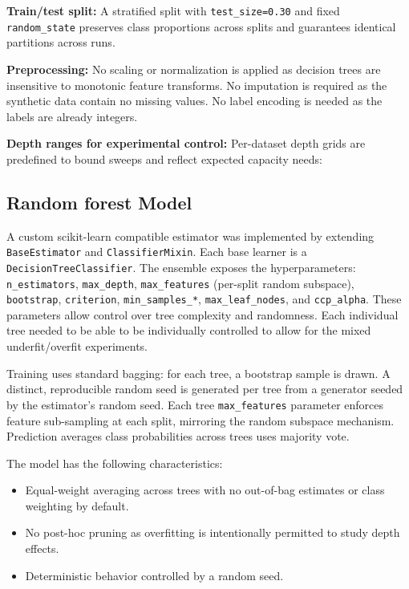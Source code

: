 \documentclass[conference]{IEEEtran}
\begin{document}
\textbf{Train/test split:} A stratified split with \texttt{test\_size=0.30} and fixed \texttt{random\_state} preserves 
class proportions across splits and guarantees identical partitions across runs.


\textbf{Preprocessing:} No scaling or normalization is applied as decision trees are insensitive to monotonic feature transforms. No imputation is
 required as the synthetic data contain no missing values. No label encoding is needed as the labels are already integers.

\textbf{Depth ranges for experimental control:} Per-dataset depth grids are predefined to bound sweeps and reflect expected capacity needs:


\subsection{Random forest Model}

A custom scikit-learn compatible estimator was implemented by extending \texttt{BaseEstimator} and \texttt{ClassifierMixin}. Each base learner is a \texttt{DecisionTreeClassifier}. The 
ensemble exposes the hyperparameters: \texttt{n\_estimators}, \texttt{max\_depth}, \texttt{max\_features} (per-split random subspace), \texttt{bootstrap}, \texttt{criterion}, 
\texttt{min\_samples\_*}, \texttt{max\_leaf\_nodes}, and \texttt{ccp\_alpha}. These parameters allow control over tree complexity and randomness. Each individual tree needed 
to be able to be individually controlled to allow for the mixed underfit/overfit experiments.

Training uses standard bagging: for each tree, a bootstrap sample is drawn. A distinct, reproducible random seed is generated per tree from a generator seeded by the estimator's random seed. Each tree \texttt{max\_features} parameter enforces feature sub-sampling at each split, mirroring the random subspace mechanism. Prediction averages class probabilities across trees uses majority vote.

The model has the following characteristics:
\begin{itemize}
  \item Equal-weight averaging across trees with no out-of-bag estimates or class weighting by default.
  \item No post-hoc pruning as overfitting is intentionally permitted to study depth effects.
  \item Deterministic behavior controlled by a random seed.
\end{itemize}
\end{document}
